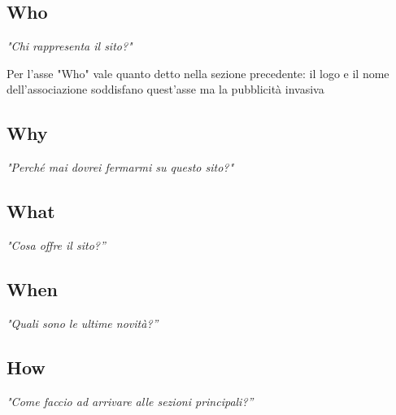     \subsection{Who}
        \begin{center}
            \textit{"Chi rappresenta il sito?"}
        \end{center}
        Per l'asse "Who" vale quanto detto nella sezione precedente: il logo e il nome dell'associazione soddisfano quest'asse ma la pubblicità invasiva 

    \subsection{Why}
    \begin{center}
        \textit{"Perché mai dovrei fermarmi su questo sito?"}
    \end{center}

    \subsection{What}
    \begin{center}
        \textit{"Cosa offre il sito?”}
    \end{center}

    \subsection{When}
    \begin{center}
        \textit{"Quali sono le ultime novità?”}
    \end{center}

    \subsection{How}
    \begin{center}
        \textit{"Come faccio ad arrivare alle sezioni principali?”}
    \end{center}

    
